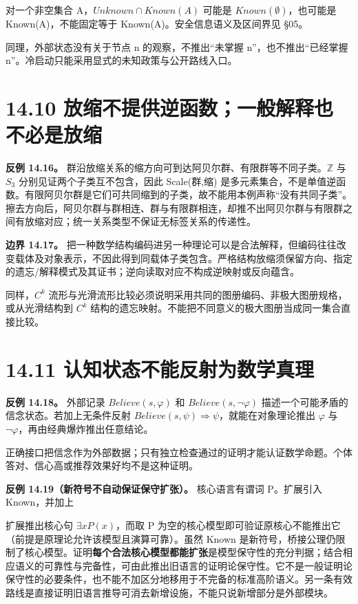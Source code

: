 \documentclass[UTF8,a4paper,zihao=-4,fontset=windows,openany]{ctexbook}
\newcommand{\mcsdisplay}[1]{%
  \par\addvspace{0.7em}%
  \sbox{\mcsmathbox}{\ensuremath{\displaystyle #1}}%
  \ifdim\wd\mcsmathbox>\linewidth
    \noindent\resizebox{\linewidth}{!}{\usebox{\mcsmathbox}}%
  \else
    \noindent\hspace*{\fill}\usebox{\mcsmathbox}\hspace*{\fill}%
  \fi
  \par\addvspace{0.7em}%
}
\def\ensuremath#1{#1}%
\def\mathrm#1{#1}%
\begin{document}
对一个非空集合 A，\(\mathrm{Unknown}\cap\mathrm{Known}(A)\) 可能是 \(\mathrm{Known}(\emptyset)\)，也可能是 Known(A)，不能固定等于 Known(A)。安全信息语义及区间界见 §05。

同理，外部状态没有关于节点 n 的观察，不推出“未掌握 n”，也不推出“已经掌握 n”。冷启动只能采用显式的未知政策与公开路线入口。

\section{14.10 放缩不提供逆函数；一般解释也不必是放缩}
\textbf{反例 14.16。} 群沿放缩关系的缩方向可到达阿贝尔群、有限群等不同子类。\(\mathbb{Z}\) 与 \(S_{3}\) 分别见证两个子类互不包含，因此 Scale(群,缩) 是多元素集合，不是单值逆函数。有限阿贝尔群是它们可共同缩到的子类，故不能用本例声称“没有共同子类”。擦去方向后，阿贝尔群与群相连、群与有限群相连，却推不出阿贝尔群与有限群之间有放缩对应；统一关系类型不保证无标签关系的传递性。

\textbf{边界 14.17。} 把一种数学结构编码进另一种理论可以是合法解释，但编码往往改变载体及对象表示，不因此得到同载体子类包含。严格结构放缩须保留方向、指定的遗忘/解释模式及其证书；逆向读取对应不构成逆映射或反向蕴含。

同样，\(C^k\) 流形与光滑流形比较必须说明采用共同的图册编码、非极大图册规格，或从光滑结构到 \(C^k\) 结构的遗忘映射。不能把不同意义的极大图册当成同一集合直接比较。

\section{14.11 认知状态不能反射为数学真理}
\textbf{反例 14.18。} 外部记录 \(\mathrm{Believe}(s,\varphi)\) 和 \(\mathrm{Believe}(s,\neg\varphi)\) 描述一个可能矛盾的信念状态。若加上无条件反射 \(\mathrm{Believe}(s,\psi)\Rightarrow\psi\)，就能在对象理论推出 \(\varphi\) 与 \(\neg\varphi\)，再由经典爆炸推出任意结论。

正确接口把信念作为外部数据；只有独立检查通过的证明才能认证数学命题。个体答对、信心高或推荐效果好均不是这种证明。

\textbf{反例 14.19（新符号不自动保证保守扩张）。} 核心语言有谓词 P。扩展引入 Known，并加上


\mcsdisplay{\exists x\,Known(x),\qquad
\forall x(Known(x)\to P(x)).}
\noindent 扩展推出核心句 \(\exists\mathrm{xP}(x)\)，而取 P 为空的核心模型即可验证原核心不能推出它（前提是原理论允许该模型且演算可靠）。虽然 Known 是新符号，桥接公理仍限制了核心模型。证明\textbf{每个合法核心模型都能扩张}是模型保守性的充分判据；结合相应语义的可靠性与完备性，可由此推出旧语言的证明论保守性。它不是一般证明论保守性的必要条件，也不能不加区分地移用于不完备的标准高阶语义。另一条有效路线是直接证明旧语言推导可消去新增设施，不能只说新增部分是外部模块。
\end{document}
